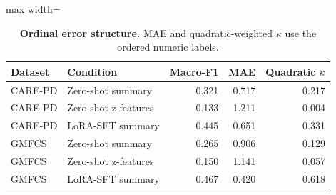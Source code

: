 \begin{table}[H]
\centering
\caption{\textbf{Ordinal error structure.} MAE and quadratic-weighted $\kappa$ use the ordered numeric labels.}
\label{tab:ordinal_metrics}
\small
\begin{adjustbox}{max width=\textwidth}
\begin{tabular}{llrrr}
\toprule
Dataset & Condition & Macro-F1 & MAE & Quadratic $\kappa$ \\
\midrule
CARE-PD & Zero-shot summary & 0.321 & 0.717 & 0.217 \\
CARE-PD & Zero-shot z-features & 0.133 & 1.211 & 0.004 \\
CARE-PD & LoRA-SFT summary & 0.445 & 0.651 & 0.331 \\
GMFCS & Zero-shot summary & 0.265 & 0.906 & 0.129 \\
GMFCS & Zero-shot z-features & 0.150 & 1.141 & 0.057 \\
GMFCS & LoRA-SFT summary & 0.467 & 0.420 & 0.618 \\
\bottomrule
\end{tabular}
\end{adjustbox}
\end{table}
